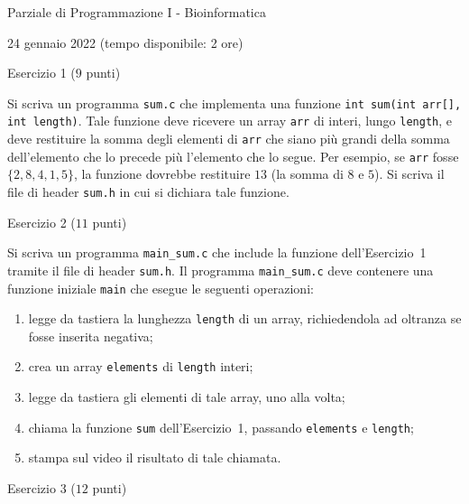 \documentclass[12pt]{article}
\begin{document}
\begin{center}{\LARGE Parziale di Programmazione I - Bioinformatica}\\
\begin{center}
  \large 24 gennaio 2022 (tempo disponibile: 2 ore)
\end{center}
\end{center}

\vspace*{1ex}
\begin{center}{\Large Esercizio 1} ($9$ punti)
\end{center}
Si scriva un programma \texttt{sum.c} che implementa una funzione \texttt{int sum(int arr[], int length)}. Tale funzione deve ricevere un array \texttt{arr} di interi, lungo \texttt{length}, e deve restituire la somma degli elementi di \texttt{arr} che siano pi\`u grandi della somma dell'elemento che lo precede pi\`u l'elemento che lo segue. Per esempio, se \texttt{arr} fosse $\{2,8,4,1,5\}$, la funzione dovrebbe restituire $13$ (la somma di $8$ e $5$). Si scriva il file di header \texttt{sum.h} in cui si dichiara tale funzione.

\vspace*{1ex}
\begin{center}{\Large Esercizio 2} ($11$ punti)\end{center}
%
Si scriva un programma \texttt{main\_sum.c} che include la funzione dell'Esercizio~1 tramite
il file di header \texttt{sum.h}.
Il programma \texttt{main\_sum.c} deve contenere una funzione iniziale \texttt{main} che esegue
le seguenti operazioni:
\begin{enumerate}
\item legge da tastiera la lunghezza \texttt{length} di un array, richiedendola ad oltranza se fosse inserita negativa;
\item crea un array \texttt{elements} di \texttt{length} interi;
\item legge da tastiera gli elementi di tale array, uno alla volta;
\item chiama la funzione \texttt{sum} dell'Esercizio~1, passando \texttt{elements} e \texttt{length};
\item stampa sul video il risultato di tale chiamata.
\end{enumerate}

\vspace*{1ex}
\begin{center}{\Large Esercizio 3} ($12$ punti)\end{center}
\end{document}
